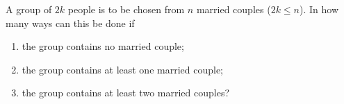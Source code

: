 A group of $2k$ people is to be chosen from $n$ married couples ($2k\le n$). In how many ways can this be done if
\begin{enumerate}
\item[(a)] the group contains no married couple;
\item[(b)] the group contains at least one married couple;
\item[(c)] the group contains at least two married couples?
\end{enumerate}

